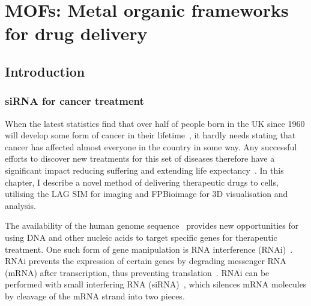 \chapter{MOFs: Metal organic frameworks for drug delivery} \label{chap:MOF}


\ifpdf
    \graphicspath{{Chapter4/Figs/Raster/}{Chapter4/Figs/PDF/}{Chapter4/Figs/}}
\else
    \graphicspath{{Chapter4/Figs/Vector/}{Chapter4/Figs/}}
\fi

%

\section{Introduction} \label{sec:MOF-intro}
\subsection{siRNA for cancer treatment}
When the latest statistics find that over half of people born in the UK since 1960 will develop some form of cancer in their lifetime~\cite{ahmad2015trends}, it hardly needs stating that cancer has affected almost everyone in the country in some way. 
Any successful efforts to discover new treatments for this set of diseases therefore have a significant impact reducing suffering and extending life expectancy~\cite{hesketh2012betrayed}. 
In this chapter, I describe a novel method of delivering therapeutic drugs to cells, utilising the LAG SIM for imaging and FPBioimage for 3D visualisation and analysis. 

The availability of the human genome sequence~\cite{venter2001sequence, bentley2008accurate} provides new opportunities for using DNA and other nucleic acids to target specific genes for therapeutic treatment. 
One such form of gene manipulation is RNA interference (RNAi)~\cite{fire1998potent, timmons1998specific}. 
RNAi prevents the expression of certain genes by degrading messenger RNA (mRNA) after transcription, thus preventing translation~\cite{hannon2002rna}. 
RNAi can be performed with small interfering RNA (siRNA)~\cite{hamilton1999species, elbashir2001duplexes}, which silences mRNA molecules by cleavage of the mRNA strand into two pieces. 

